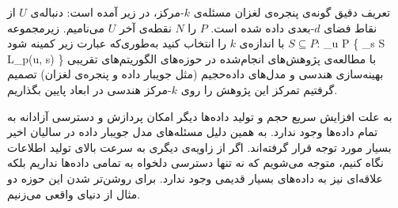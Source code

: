 تعریف دقیق گونه‌ی پنجره‌ی لغزان مسئله‌ی $k$‌-مرکز، در زیر آمده است:
 دنباله‌ی $U$ از نقاط فضای $d$-بعدی داده شده است. $P$ را $N$ نقطه‌ی آخر $U$ می‌نامیم.
زیرمجموعه $S \subseteq P$ با اندازه‌ی $k$ را انتخاب کنید به‌طوری‌که عبارت زیر کمینه شود:
\max_{u \in P} \{ \min_{s \in S} L_p(u, s) \}
با مطالعه‌ی پژوهش‌های انجام‌شده در حوزه‌های الگوریتم‌های تقریبی بهینه‌سازی هندسی و مدل‌های داده‌حجیم (مثل جویبار داده و پنجره‌ی لغزان) تصمیم گرفتیم تمرکز این پژوهش را روی $k$-مرکز هندسی در ابعاد پایین بگذاریم.


به علت افزایش سریع حجم و تولید داده‌ها دیگر امکان پردازش و دسترسی آزادانه به تمام داده‌ها وجود ندارد. به همین دلیل مسئله‌های مدل جویبار داده در سالیان اخیر بسیار مورد توجه قرار گرفته‌اند. اگر از زاویه‌ی دیگری به سرعت بالای تولید اطلاعات نگاه کنیم، متوجه می‌شویم که نه تنها دسترسی دلخواه به تمامی داده‌ها نداریم بلکه علاقه‌ای نیز به داده‌های بسیار قدیمی وجود ندارد. برای روشن‌تر شدن این حوزه دو مثال از دنیای واقعی می‌زنیم. 


